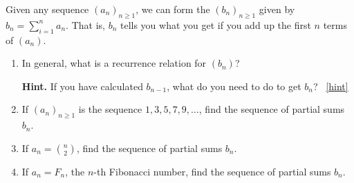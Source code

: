 \documentclass{book}
\begin{document}
\setcounter{project}{145}
\addtocounter{project}{-1}
\begin{activity}[]\label{activity-138}
\hypertarget{p-970}{}%
Given any sequence \((a_n)_{n \ge 1}\), we can form the  \((b_n)_{n \ge 1}\) given by \(b_n = \sum_{i = 1}^n a_n\).  That is, \(b_n\) tells you what you get if you add up the first \(n\) terms of \((a_n)\).%
\begin{enumerate}[font=\bfseries,label=(\alph*),ref=\alph*]
\item\label{task-176} \hypertarget{p-971}{}%
In general, what is a recurrence relation for \((b_n)\)?%
\par\smallskip%
\noindent\textbf{Hint.}\hypertarget{hint-104}{}\quad%
\hypertarget{p-972}{}%
If you have calculated \(b_{n-1}\), what do you need to do to get \(b_n\)?%
~\hfill{\tiny\hyperlink{a-145.a}{[hint]}\hypertarget{q-145.a}{}}\item\label{task-177} \hypertarget{p-973}{}%
If \((a_n)_{n \ge 1}\) is the sequence \(1, 3, 5, 7, 9, \ldots\), find the sequence of partial sums \(b_n\).%
\item\label{task-178} \hypertarget{p-974}{}%
If \(a_n = \binom{n}{2}\), find the sequence of partial sums \(b_n\).%
\item\label{task-179} \hypertarget{p-975}{}%
If \(a_n = F_n\), the \(n\)-th Fibonacci number, find the sequence of partial sums \(b_n\).%
\end{enumerate}
\end{activity}
\end{document}
